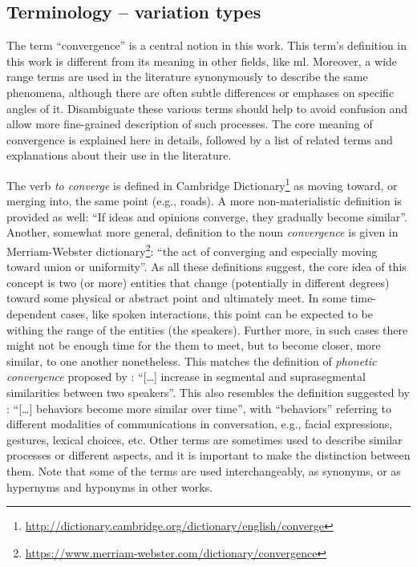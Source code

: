 

\subsection{Terminology -- variation types}
\label{subsec:variation_types}

The term \enquote{convergence} is a central notion in this work.
This term's definition in this work is different from its meaning in other fields, like \ac{ml}.
Moreover, a wide range terms are used in the literature synonymously to describe the same phenomena, although there are often subtle differences or emphases on specific angles of it.
Disambiguate these various terms should help to avoid confusion and allow more fine-grained description of such processes.
The core meaning of convergence is explained here in details, followed by a list of related terms and explanations about their use in the literature.

The verb \textit{to converge} is defined in Cambridge Dictionary\footnote{\url{http://dictionary.cambridge.org/dictionary/english/converge}} as moving toward, or merging into, the same point (e.g., roads).
A more non-materialistic definition is provided as well: \enquote{If ideas and opinions converge, they gradually become similar}.
Another, somewhat more general, definition to the noun \textit{convergence} is given in Merriam-Webster dictionary\footnote{\url{https://www.merriam-webster.com/dictionary/convergence}}: \enquote{the act of converging and especially moving toward union or uniformity}.
As all these definitions suggest, the core idea of this concept is two (or more) entities that change (potentially in different degrees) toward some physical or abstract point and ultimately meet.
In some time-dependent cases, like spoken interactions, this point can be expected to be withing the range of the entities (the speakers).
Further more, in such cases there might not be enough time for the them to meet, but to become closer, more similar, to one another nonetheless.
This matches the definition of \emph{phonetic convergence} proposed by \citet{Pardo2006phonetic}: \enquote{[\ldots] increase in segmental and suprasegmental similarities between two speakers}.
This also resembles the definition suggested by \citet{Xia2014prosodic}: \enquote{[\ldots] behaviors become more similar over time}, with \enquote{behaviors} referring to different modalities of communications in conversation, e.g., facial expressions, gestures, lexical choices, etc.
Other terms are sometimes used to describe similar processes or different aspects, and it is important to make the distinction between them.
Note that some of the terms are used interchangeably, as synonyms, or as hypernyms and hyponyms in other works.


